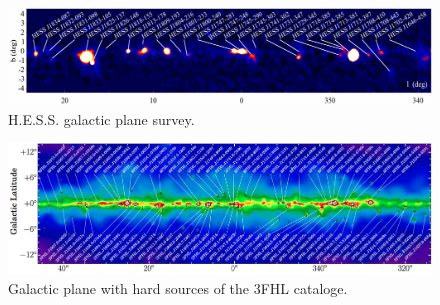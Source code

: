\documentclass[a4paper]{article}
\begin{document}
\begin{figure}[h]
	\centering
	\includegraphics[width=1.\textwidth]{HESS_GalacticPlaneSurvey}
    \caption{H.E.S.S.
     galactic plane survey.}
    \label{TotalData_Sum}
\end{figure}
\begin{figure}[h]
	\centering
	\includegraphics[width=1.\textwidth]{3FHL}
    \caption{Galactic plane with hard sources of the 3FHL cataloge.}
    \label{TotalData_Sum}
\end{figure}
\end{document}
